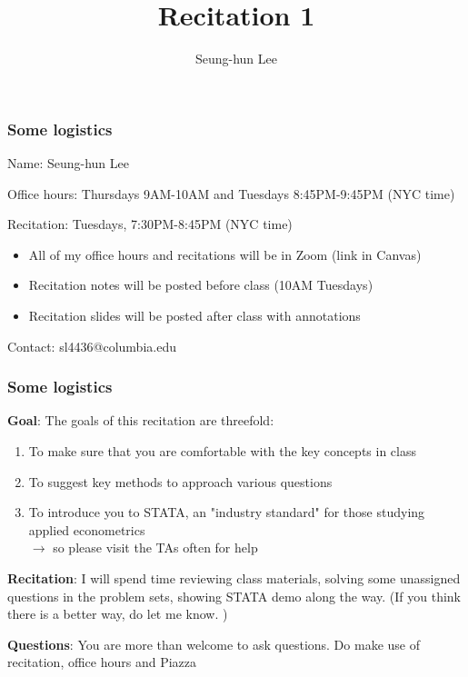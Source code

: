 \documentclass[compress]{beamer}
\title[Recitation 1]{Recitation 1} %
\author[Seung-hun Lee]{Seung-hun Lee}
\institute[Columbia University]{Columbia University}
\date[]{}
\newenvironment{wideitemize}{\itemize\addtolength{\itemsep}{10pt}}{\enditemize}
\begin{document}
\begin{frame}
\titlepage
\end{frame}



\begin{frame}
\frametitle{Some logistics}
\begin{wideitemize}
\item Name: Seung-hun Lee
\item Office hours: Thursdays 9AM-10AM and Tuesdays 8:45PM-9:45PM (NYC time)
\item Recitation: Tuesdays, 7:30PM-8:45PM (NYC time)
\begin{itemize}
\item All of my office hours and recitations will be in Zoom (link in Canvas)
\item Recitation notes will be posted before class (10AM Tuesdays)
\item Recitation slides will be posted after class with annotations
\end{itemize}
\item Contact: sl4436@columbia.edu
 \end{wideitemize}
\end{frame}

\begin{frame}
\frametitle{Some logistics}
\begin{wideitemize}
\item  \textbf{Goal}: The goals of this recitation are threefold: 
\begin{enumerate}
\item To make sure that you are comfortable with the key concepts in class
\item To suggest key methods to approach various questions
\item To introduce you to STATA, an "industry standard" for those studying applied econometrics\\
$\to$ so please visit the TAs often for help
\end{enumerate}
\item \textbf{Recitation}: I will spend time reviewing class materials, solving some unassigned questions in the problem sets, showing STATA demo along the way. (If you think there is a better way, do let me know. )
\item  \textbf{Questions}: You are more than welcome to ask questions. Do make use of recitation, office hours and Piazza
\end{wideitemize}
\end{frame}
\end{document}
